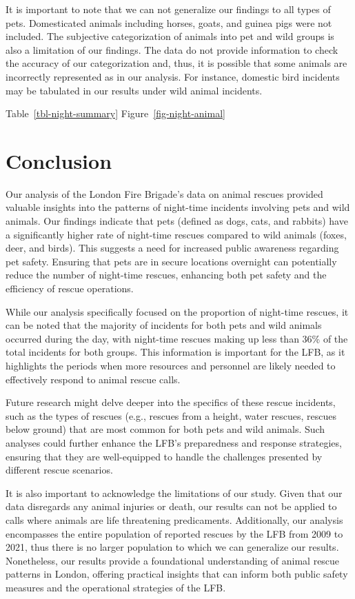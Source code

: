 \documentclass[
]{article}
\begin{document}
It is important to note that we can not generalize our findings to all
types of pets. Domesticated animals including horses, goats, and guinea
pigs were not included. The subjective categorization of animals into
pet and wild groups is also a limitation of our findings. The data do
not provide information to check the accuracy of our categorization and,
thus, it is possible that some animals are incorrectly represented as in
our analysis. For instance, domestic bird incidents may be tabulated in
our results under wild animal incidents.

Table~\ref{tbl-night-summary} Figure~\ref{fig-night-animal}

\hypertarget{conclusion}{%
\section{Conclusion}\label{conclusion}}

Our analysis of the London Fire Brigade's data on animal rescues
provided valuable insights into the patterns of night-time incidents
involving pets and wild animals. Our findings indicate that pets
(defined as dogs, cats, and rabbits) have a significantly higher rate of
night-time rescues compared to wild animals (foxes, deer, and birds).
This suggests a need for increased public awareness regarding pet
safety. Ensuring that pets are in secure locations overnight can
potentially reduce the number of night-time rescues, enhancing both pet
safety and the efficiency of rescue operations.

While our analysis specifically focused on the proportion of night-time
rescues, it can be noted that the majority of incidents for both pets
and wild animals occurred during the day, with night-time rescues making
up less than 36\% of the total incidents for both groups. This
information is important for the LFB, as it highlights the periods when
more resources and personnel are likely needed to effectively respond to
animal rescue calls.

Future research might delve deeper into the specifics of these rescue
incidents, such as the types of rescues (e.g., rescues from a height,
water rescues, rescues below ground) that are most common for both pets
and wild animals. Such analyses could further enhance the LFB's
preparedness and response strategies, ensuring that they are
well-equipped to handle the challenges presented by different rescue
scenarios.

It is also important to acknowledge the limitations of our study. Given
that our data disregards any animal injuries or death, our results can
not be applied to calls where animals are life threatening predicaments.
Additionally, our analysis encompasses the entire population of reported
rescues by the LFB from 2009 to 2021, thus there is no larger population
to which we can generalize our results. Nonetheless, our results provide
a foundational understanding of animal rescue patterns in London,
offering practical insights that can inform both public safety measures
and the operational strategies of the LFB.
\end{document}

